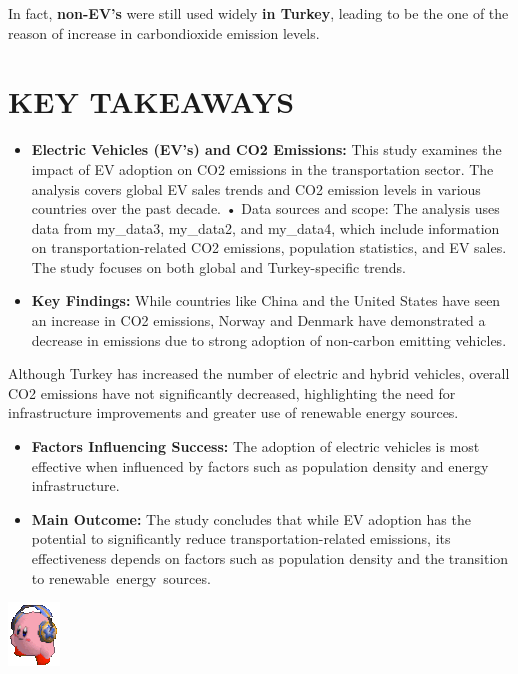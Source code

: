 \documentclass[
  11pt,
  a4paper,
  DIV=11,
  numbers=noendperiod]{scrartcl}
\begin{document}
In fact, \textbf{non-EV's} were still used widely \textbf{in Turkey},
leading to be the one of the reason of increase in carbondioxide
emission levels.

\section{KEY TAKEAWAYS}\label{key-takeaways}

\begin{itemize}
\item
  \textbf{Electric Vehicles (EV's) and CO2 Emissions:} This study
  examines the impact of EV adoption on CO2 emissions in the
  transportation sector. The analysis covers global EV sales trends and
  CO2 emission levels in various countries over the past decade. • Data
  sources and scope: The analysis uses data from my\_data3, my\_data2,
  and my\_data4, which include information on transportation-related CO2
  emissions, population statistics, and EV sales. The study focuses on
  both global and Turkey-specific trends.
\item
  \textbf{Key Findings:} While countries like China and the United
  States have seen an increase in CO2 emissions, Norway and Denmark have
  demonstrated a decrease in emissions due to strong adoption of
  non-carbon emitting vehicles.
\end{itemize}

Although Turkey has increased the number of electric and hybrid
vehicles, overall CO2 emissions have not significantly decreased,
highlighting the need for infrastructure improvements and greater use of
renewable energy sources.

\begin{itemize}
\item
  \textbf{Factors Influencing Success:} The adoption of electric
  vehicles is most effective when influenced by factors such as
  population density and energy infrastructure.
\item
  \textbf{Main Outcome:} The study concludes that while EV adoption has
  the potential to significantly reduce transportation-related
  emissions, its effectiveness depends on factors such as population
  density and the transition to renewable~energy~sources.
\end{itemize}

\begin{center}
\includegraphics{docs/jaydenj-kirby.gif}
\end{center}
\end{document}
